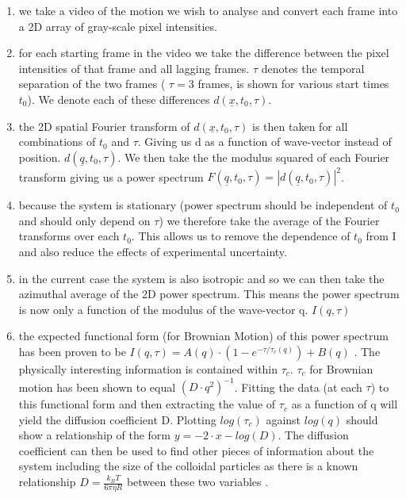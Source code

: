 \documentclass[11pt]{article}
\begin{document}
\begin{enumerate}[label=\alph*]
\item we take a video of the motion we wish to analyse and convert each frame into a 2D array of gray-scale pixel intensities.
\item for each starting frame in the video we take the difference between the pixel intensities of that frame and all lagging frames. $ \tau $ 
denotes the temporal separation of the two frames ( $ \tau = 3 $ frames,  is shown for various start times $ t_0 $). We denote each of these differences $ d(\underline{x}, t_0, \tau) $.
\item the 2D spatial Fourier transform of $ d(\underline{x}, t_0, \tau) $ is then taken for all combinations of $ t_0 $ and $ \tau $. Giving us d as a function of wave-vector instead of position. $ d(\underline{q}, t_0, \tau) $. We then take the the modulus squared of each Fourier transform giving us a power spectrum $F(\underline{q}, t_0, \tau) = |d(\underline{q}, t_0, \tau)|^2$.
\item because the system is stationary (power spectrum should be independent of $t_0$ and should only depend on $\tau$) we therefore take the average of the Fourier transforms over each $t_0$. This allows us to remove the dependence of $t_0$ from I and also reduce the effects of experimental uncertainty.
\item in the current case the system is also isotropic and so we can then take the azimuthal average of the 2D power spectrum. This means the power spectrum is now only a function of the modulus of the wave-vector q. $I(q, \tau)$
\item the expected functional form (for Brownian Motion) of this power spectrum has been proven to be $I(q, \tau) = A(q) \cdot (1 - e^{-\tau / \tau_c (q)}) + B(q)$ \cite{DLSPecora}. The physically interesting information is contained within $\tau_c$. $\tau_c$ for Brownian motion has been shown to equal $(D \cdot q^2)^{-1}$. Fitting the data (at each $\tau$) to this functional form and then extracting the value of $\tau_c$ as a function of q will yield the diffusion coefficient D. Plotting $log(\tau_c)$ against $log(q)$ should show a relationship of the form $y = -2\cdot x - log(D)$. The diffusion coefficient can then be used to find other pieces of information about the system including the size of the colloidal particles as there is a known relationship $D=\frac{k_B T}{6 \pi \eta R}$ between these two variables \cite{wynot_2002}.
\end{enumerate}
\end{document}
